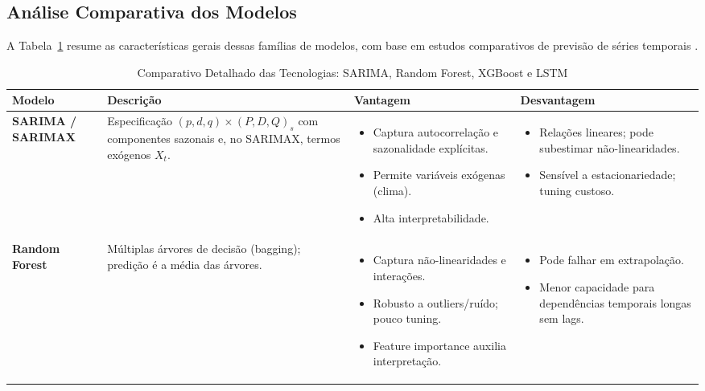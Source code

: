 \newpage
\subsection{Análise Comparativa dos Modelos}

A Tabela~\ref{tab:comparativo_detalhado_tecnologias} resume as características gerais dessas famílias de modelos, com base em estudos comparativos de previsão de séries temporais \cite{aiyegbeni2024comparative}.

\begin{table}[!ht]
    \centering
    \small
    \caption{Comparativo Detalhado das Tecnologias: SARIMA, Random Forest, XGBoost e LSTM}
    \label{tab:comparativo_detalhado_tecnologias}
    \setlength{\tabcolsep}{3pt} %
    \begin{tabular}{|p{}|p{}|p{}|p{}|}
    \hline
    \textbf{Modelo} & \textbf{Descrição} & \textbf{Vantagem} & \textbf{Desvantagem} \\ \hline
    \textbf{SARIMA / SARIMAX} & Especificação $(p,d,q)\times(P,D,Q)_s$ com componentes sazonais e, no SARIMAX, termos exógenos $X_t$. & \begin{itemize}[leftmargin=*,noitemsep,topsep=0pt] \item Captura autocorrelação e sazonalidade explícitas. \item Permite variáveis exógenas (clima). \item Alta interpretabilidade. \end{itemize} & \begin{itemize}[leftmargin=*,noitemsep,topsep=0pt] \item Relações lineares; pode subestimar não-linearidades. \item Sensível a estacionariedade; tuning custoso. \end{itemize} \\ \hline
    \textbf{Random Forest} & Múltiplas árvores de decisão (bagging); predição é a média das árvores. & \begin{itemize}[leftmargin=*,noitemsep,topsep=0pt] \item Captura não-linearidades e interações. \item Robusto a outliers/ruído; pouco tuning. \item Feature importance auxilia interpretação. \end{itemize} & \begin{itemize}[leftmargin=*,noitemsep,topsep=0pt] \item Pode falhar em extrapolação. \item Menor capacidade para dependências temporais longas sem lags. \end{itemize} \\ \hline

\end{tabular}
\end{table}
